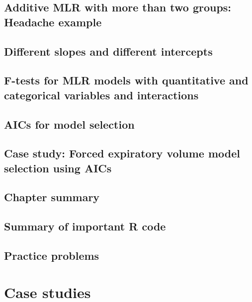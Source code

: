 \documentclass[]{book}
\begin{document}
\hypertarget{section8-10}{%
\section{Additive MLR with more than two groups: Headache example}\label{section8-10}}

\hypertarget{section8-11}{%
\section{Different slopes and different intercepts}\label{section8-11}}

\hypertarget{section8-12}{%
\section{F-tests for MLR models with quantitative and categorical variables and interactions}\label{section8-12}}

\hypertarget{section8-13}{%
\section{AICs for model selection}\label{section8-13}}

\hypertarget{section8-14}{%
\section{Case study: Forced expiratory volume model selection using AICs}\label{section8-14}}

\hypertarget{section8-15}{%
\section{Chapter summary}\label{section8-15}}

\hypertarget{section8-16}{%
\section{Summary of important R code}\label{section8-16}}

\hypertarget{section8-17}{%
\section{Practice problems}\label{section8-17}}

\hypertarget{chapter9}{%
\chapter{Case studies}\label{chapter9}}
\end{document}
